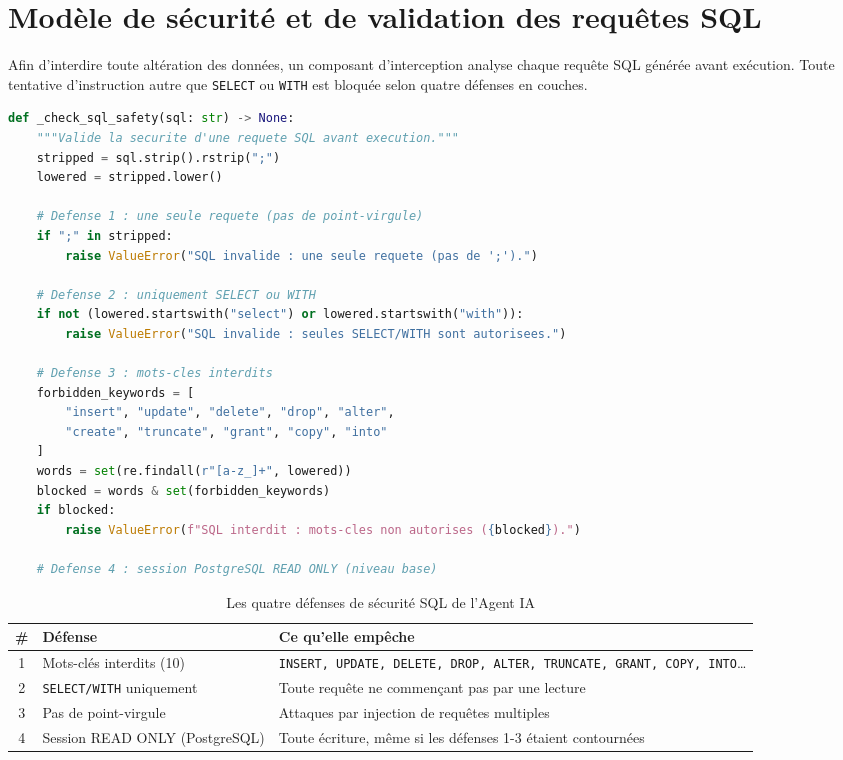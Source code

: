\documentclass[a4paper,12pt]{report}
\begin{document}
\section{Modèle de sécurité et de validation des requêtes SQL}
\begin{doublespace}
Afin d'interdire toute altération des données, un composant d'interception analyse chaque requête SQL générée avant exécution. Toute tentative d'instruction autre que \texttt{SELECT} ou \texttt{WITH} est bloquée selon quatre défenses en couches.

\begin{lstlisting}[language=python, caption={Module de validation et d'exécution sécurisée des requêtes SQL}]
def _check_sql_safety(sql: str) -> None:
    """Valide la securite d'une requete SQL avant execution."""
    stripped = sql.strip().rstrip(";")
    lowered = stripped.lower()

    # Defense 1 : une seule requete (pas de point-virgule)
    if ";" in stripped:
        raise ValueError("SQL invalide : une seule requete (pas de ';').")

    # Defense 2 : uniquement SELECT ou WITH
    if not (lowered.startswith("select") or lowered.startswith("with")):
        raise ValueError("SQL invalide : seules SELECT/WITH sont autorisees.")

    # Defense 3 : mots-cles interdits
    forbidden_keywords = [
        "insert", "update", "delete", "drop", "alter",
        "create", "truncate", "grant", "copy", "into"
    ]
    words = set(re.findall(r"[a-z_]+", lowered))
    blocked = words & set(forbidden_keywords)
    if blocked:
        raise ValueError(f"SQL interdit : mots-cles non autorises ({blocked}).")

    # Defense 4 : session PostgreSQL READ ONLY (niveau base)
\end{lstlisting}

\begin{table}[H]
\centering
\begin{tabular}{|c|p{4cm}|p{7cm}|}
    \hline
    \textbf{\#} & \textbf{Défense} & \textbf{Ce qu'elle empêche} \\
    \hline
    1 & Mots-clés interdits (10) & \texttt{INSERT, UPDATE, DELETE, DROP, ALTER, TRUNCATE, GRANT, COPY, INTO}… \\
    \hline
    2 & \texttt{SELECT/WITH} uniquement & Toute requête ne commençant pas par une lecture \\
    \hline
    3 & Pas de point-virgule & Attaques par injection de requêtes multiples \\
    \hline
    4 & Session READ ONLY (PostgreSQL) & Toute écriture, même si les défenses 1-3 étaient contournées \\
    \hline
\end{tabular}
\caption{Les quatre défenses de sécurité SQL de l'Agent IA}
\label{tab:sql_defenses}
\end{table}
\end{doublespace}
\end{document}
